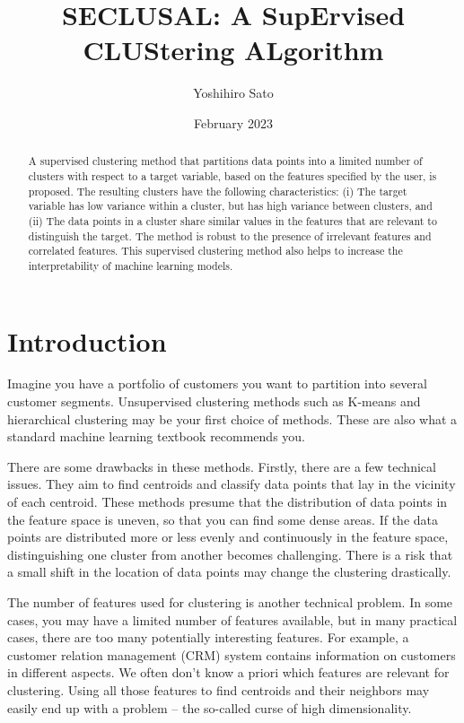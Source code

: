 \documentclass{article}
\title{SECLUSAL: A SupErvised CLUStering ALgorithm}
\author{Yoshihiro Sato}
\date{February 2023}
\begin{document}
\begin{abstract}
A supervised clustering method that partitions data points into a limited number of clusters with respect to a target variable, based on the features specified by the user, is proposed.
The resulting clusters have the following characteristics: 
(i) The target variable has low variance within a cluster, but has high variance between clusters, and (ii) The data points in a cluster share similar values in the features that are relevant to distinguish the target. 
The method is robust to %
the presence of irrelevant features and correlated features. 
This supervised clustering method also helps to increase the interpretability of machine learning models.
\end{abstract}

\maketitle

\section{Introduction}

Imagine you have a portfolio of customers you want to partition into several customer segments. Unsupervised clustering methods such as K-means and hierarchical clustering may be your first choice of methods. These are also what a standard machine learning textbook recommends you. 

There are some drawbacks in these methods. Firstly, there are a few technical issues. They aim to find centroids and classify data points that lay in the vicinity of each centroid. These methods presume that the distribution of data points in the feature space is uneven, so that you can find some dense areas. If the data points are distributed more or less evenly and continuously in the feature space, distinguishing one cluster from another becomes challenging. There is a risk that a small shift in the location of data points may change the clustering drastically.

The number of features used for clustering is another technical problem. In some cases, you may have a limited number of features available, but in many practical cases, there are too many potentially interesting features. For example, a customer relation management (CRM) system contains information on customers in different aspects. We often don’t know a priori which features are relevant for clustering. Using all those features to find centroids and their neighbors may easily end up with a problem -- the so-called curse of high dimensionality. 
\end{document}
